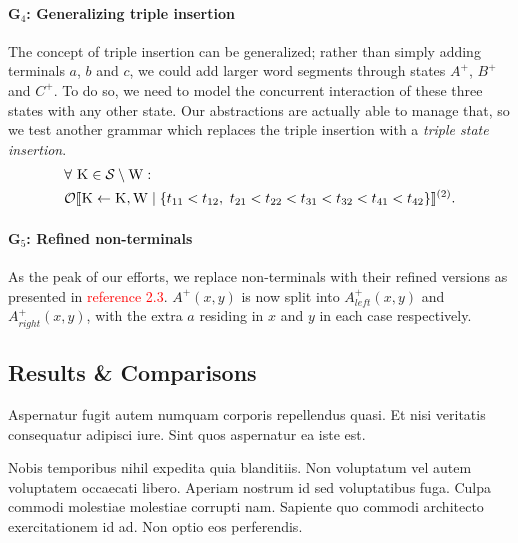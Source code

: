 \documentclass[nonatbib,numbers,10pt]{sigplanconf}
\newcommand\todo[1]{\textcolor{red}{#1}}
\newcommand\s{\textsc}
\newcommand{\Orderr}[5]{
	\mathcal{#1}\llbracket #2 \leftarrow #3 \mid \{ #4 \} \rrbracket^{(#5)}.
}
\newcommand{\Or}[4]{\Orderr{O}{#1}{#2}{#3}{#4}}
\begin{document}
\paragraph{G$_4$: Generalizing triple insertion}
The concept of triple insertion can be generalized; rather than simply adding terminals $a$, $b$ and $c$, we could add larger word segments through states $A^{+}$, $B^{+}$ and $C^{+}$. To do so, we need to model the concurrent interaction of these three states with any other state. Our abstractions are actually able to manage that, so we test another grammar which replaces the triple insertion with a \textit{triple state insertion}.
\begin{align*}
&\forall \ \s{K} \in \mathcal{S} \setminus \s{W}:\\ 
&\Or{\s{K}}{\s{K}, \s{W}}{t_{11} < t_{12},\ t_{21} < t_{22} < t_{31} < t_{32} < t_{41} < t_{42}}{2}
\end{align*}
\paragraph{G$_5$: Refined non-terminals}
As the peak of our efforts, we replace non-terminals with their refined versions as presented in \todo{reference 2.3}. $A^{+}(x,y)$ is now split into $A^{+}_{left}(x,y)$ and $A^{+}_{right}(x,y)$, with the extra $a$ residing in $x$ and $y$ in each case respectively.
\subsection{Results \& Comparisons}
Aspernatur fugit autem numquam corporis repellendus quasi. Et nisi veritatis consequatur adipisci iure. Sint quos aspernatur ea iste est.

Nobis temporibus nihil expedita quia blanditiis. Non voluptatum vel autem voluptatem occaecati libero. Aperiam nostrum id sed voluptatibus fuga. Culpa commodi molestiae molestiae corrupti nam. Sapiente quo commodi architecto exercitationem id ad. Non optio eos perferendis.
\end{document}
